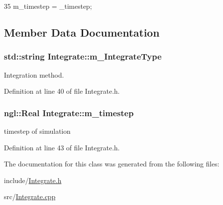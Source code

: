 \begin{DoxyCode}
35 { m_timestep = _timestep; }
\end{DoxyCode}




\subsection{Member Data Documentation}
\hypertarget{class_integrate_a098af16c9cf3d1c59a771f3e39c6d534}{
\subsubsection[{m\_\-IntegrateType}]{\setlength{\rightskip}{0pt plus 5cm}std::string {\bf Integrate::m\_\-IntegrateType}}}
\label{class_integrate_a098af16c9cf3d1c59a771f3e39c6d534}


Integration method. 



Definition at line 40 of file Integrate.h.

\hypertarget{class_integrate_a2d8b50d0e8ae35985925e0f636215aee}{
\subsubsection[{m\_\-timestep}]{\setlength{\rightskip}{0pt plus 5cm}ngl::Real {\bf Integrate::m\_\-timestep}}}
\label{class_integrate_a2d8b50d0e8ae35985925e0f636215aee}


timestep of simulation 



Definition at line 43 of file Integrate.h.



The documentation for this class was generated from the following files:\begin{DoxyCompactItemize}
\item 
include/\hyperlink{_integrate_8h}{Integrate.h}\item 
src/\hyperlink{_integrate_8cpp}{Integrate.cpp}\end{DoxyCompactItemize}
